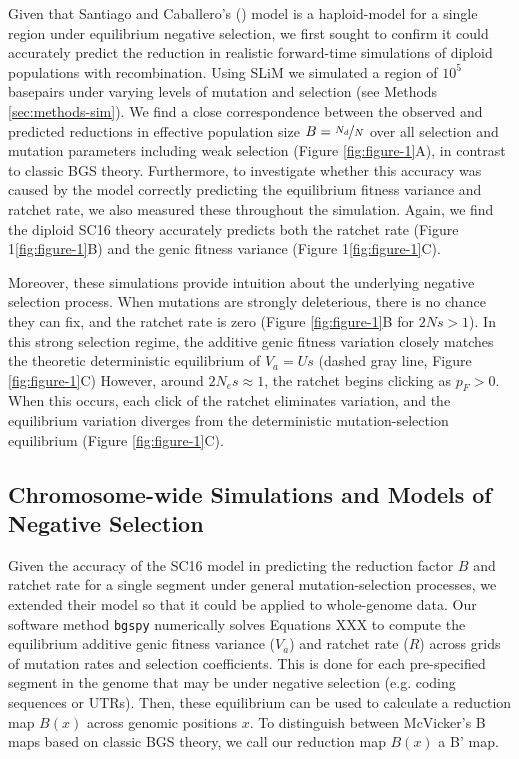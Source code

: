 \documentclass[11pt]{article}
\begin{document}
Given that Santiago and Caballero's (\citeyear{Santiago2016-mu}) model is a
haploid-model for a single region under equilibrium negative selection, we
first sought to confirm it could accurately predict the reduction in realistic
forward-time simulations of diploid populations with recombination. Using SLiM
\parencite{Haller2019-vu,Haller2023-uk} we simulated a region of $10^5$
basepairs under varying levels of mutation and selection (see Methods
\ref{sec:methods-sim}). We find a close correspondence between the observed
and predicted reductions in effective population size $B=\nicefrac{N_d}{N}$
over all selection and mutation parameters including weak selection (Figure
\ref{fig:figure-1}A), in contrast to classic BGS theory. Furthermore, to
investigate whether this accuracy was caused by the model correctly predicting
the equilibrium fitness variance and ratchet rate, we also measured these
throughout the simulation. Again, we find the diploid SC16 theory accurately
predicts both the ratchet rate (Figure 1\ref{fig:figure-1}B) and the genic
fitness variance (Figure 1\ref{fig:figure-1}C).

Moreover, these simulations provide intuition about the underlying negative
selection process. When mutations are strongly deleterious, there is no chance
they can fix, and the ratchet rate is zero (Figure \ref{fig:figure-1}B for $2Ns
> 1$). In this strong selection regime, the additive genic fitness variation
closely matches the theoretic deterministic equilibrium of $V_a = Us$ (dashed
gray line, Figure \ref{fig:figure-1}C) However, around $2N_e s \approx 1$, the
ratchet begins clicking as $p_F > 0$. When this occurs, each click of the
ratchet eliminates variation, and the equilibrium variation diverges from the
deterministic mutation-selection equilibrium (Figure \ref{fig:figure-1}C).

\subsection*{Chromosome-wide Simulations and Models of Negative Selection}

Given the accuracy of the SC16 model in predicting the reduction factor $B$ and
ratchet rate for a single segment under general mutation-selection processes,
we extended their model so that it could be applied to whole-genome data. Our
software method \texttt{bgspy} numerically solves Equations XXX to compute the
equilibrium additive genic fitness variance ($V_a$) and ratchet rate ($R$)
across grids of mutation rates and selection coefficients. This is done for
each pre-specified segment in the genome that may be under negative selection
(e.g. coding sequences or UTRs). Then, these equilibrium can be used to
calculate a reduction map $B(x)$ across genomic positions $x$. To distinguish
between McVicker's B maps based on classic BGS theory, we call our reduction
map $B(x)$ a B' map.
\end{document}
